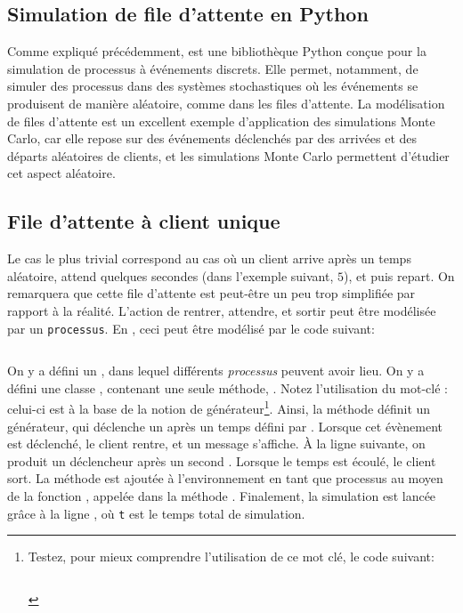         \subsection{Simulation de file d'attente en Python}
            Comme expliqué précédemment,  est une bibliothèque Python conçue pour la simulation de processus à événements discrets. Elle permet, notamment, de simuler des processus dans des systèmes stochastiques où les événements se produisent de manière aléatoire, comme dans les files d'attente. La modélisation de files d'attente est un excellent exemple d'application des simulations Monte Carlo, car elle repose sur des événements déclenchés par des arrivées et des départs aléatoires de clients, et les simulations Monte Carlo permettent d'étudier cet aspect aléatoire.

        \subsection{File d'attente à client unique}
            Le cas le plus trivial correspond au cas où un client arrive après un temps aléatoire, attend quelques secondes (dans l'exemple suivant, $5$), et puis repart. On remarquera que cette file d'attente est peut-être un peu trop simplifiée par rapport à la réalité. L'action de rentrer, attendre, et sortir peut être modélisée par un \texttt{processus}. En , ceci peut être modélisé par le code suivant:
            \inputminted{python}{codes/client_unique.py}
            On y a défini un , dans lequel différents \textit{processus} peuvent avoir lieu. On y a défini une classe , contenant une seule méthode, . Notez l'utilisation du mot-clé : celui-ci est à la base de la notion de générateur\footnote{Testez, pour mieux comprendre l'utilisation de ce mot clé, le code suivant:
            \inputminted[fontsize=\tiny]{python}{codes/yield.py}}. Ainsi, la méthode  définit un générateur, qui déclenche un  après un temps défini par . Lorsque cet évènement est déclenché, le client rentre, et un message s'affiche. À la ligne suivante, on produit un déclencheur après un second . Lorsque le temps est écoulé, le client sort.
            La méthode  est ajoutée à l'environnement en tant que processus au moyen de la fonction , appelée dans la méthode . Finalement, la simulation est lancée grâce à la ligne , où \texttt{t} est le temps total de simulation.
            
